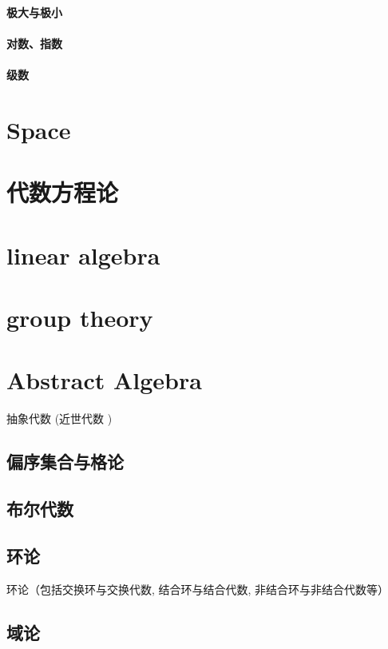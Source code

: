 \documentclass[UTF8]{../09-Mathematics}
\begin{document}
\subsubsection{极大与极小}
\subsubsection{对数、指数}
\subsubsection{级数}



\chapter{Space} %



\chapter{代数方程论}

\chapter{linear algebra}


\chapter{group theory}




\chapter{Abstract Algebra}
抽象代数 (近世代数 )

\section{偏序集合与格论}
\section{布尔代数}
\section{环论}
环论（包括交换环与交换代数, 结合环与结合代数, 非结合环与非结合代数等）
\section{域论}
\end{document}
